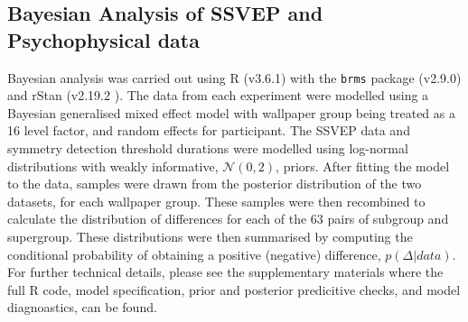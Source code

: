 \documentclass[9pt,twocolumn,twoside,lineno]{pnas-new}
\begin{document}
\subsection*{Bayesian Analysis of SSVEP and Psychophysical data}
Bayesian analysis was carried out using R (v3.6.1) \cite{R} with the \texttt{brms} package (v2.9.0) \cite{burkner2017} and rStan (v2.19.2 \cite{rStan}). The data from each experiment were modelled using a Bayesian generalised mixed effect model with wallpaper group being treated as a 16 level factor, and random effects for participant. The SSVEP data and symmetry detection threshold durations were modelled using log-normal distributions with weakly informative, $ \mathcal{N}(0, 2)$, priors. After fitting the model to the data, samples were drawn from the posterior distribution of the two datasets, for each wallpaper group. These samples were then recombined to calculate the distribution of differences for each of the 63 pairs of subgroup and supergroup. These distributions were then summarised by computing the conditional probability of obtaining a positive (negative) difference, $p(\Delta | data)$. For further technical details, please see the supplementary materials where the full R code, model specification, prior and posterior predicitive checks, and model diagnoastics, can be found. 




\showmatmethods{} %


\showacknow{} %

 

\end{document}
